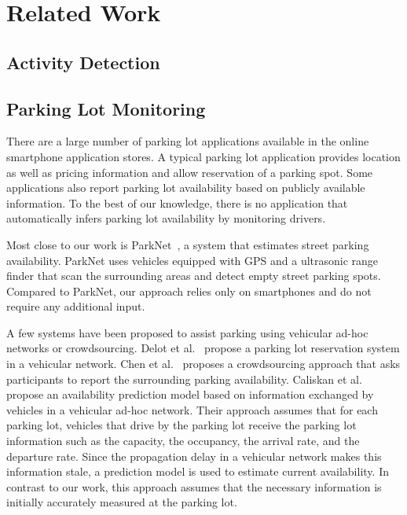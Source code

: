 \section{Related Work}
\label{sec-related}

\subsection{Activity Detection}

\subsection{Parking Lot Monitoring}

There are a large number of parking lot applications available in the online
smartphone application stores. A typical parking lot application provides
location as well as pricing information and allow reservation of a parking spot.
Some applications also report parking lot availability based on publicly
available information. To the best of our knowledge, there is no application
that automatically infers parking lot availability by monitoring drivers.

Most close to our work is ParkNet~\cite{Mathur:2010:PDS}, a system that
estimates street parking availability. ParkNet uses vehicles equipped with GPS
and a ultrasonic range finder that scan the surrounding areas and detect
empty street parking spots. Compared to ParkNet, our approach relies only on
smartphones and do not require any additional input.

A few systems have been proposed to assist parking using vehicular ad-hoc
networks or crowdsourcing. Delot et al.~\cite{Delot:2009:CRP} propose a parking
lot reservation system in a vehicular network. Chen et al.~\cite{Chen:2012:COS}
proposes a crowdsourcing approach that asks participants to report the
surrounding parking availability. Caliskan et al.~\cite{4212497} propose an
availability prediction model based on information exchanged by vehicles in a
vehicular ad-hoc network. Their approach assumes that for each parking lot,
vehicles that drive by the parking lot receive the parking lot information such
as the capacity, the occupancy, the arrival rate, and the departure rate. Since
the propagation delay in a vehicular network makes this information stale, a
prediction model is used to estimate current availability. In contrast to
our work, this approach assumes that the necessary information is initially
accurately measured at the parking lot.

